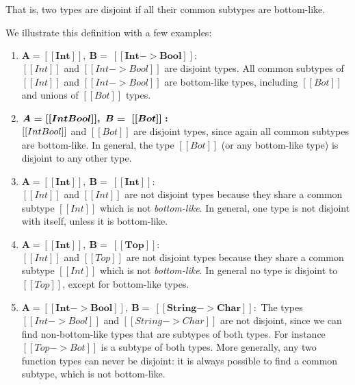 \noindent That is, two types are disjoint if all their common subtypes are bottom-like.
\begin{comment}
With this definition we have that different primitive types are disjoint. For example
$[[Int]] * [[Bool]]$ since the only common subtypes of $[[Int]]$ and $[[Bool]]$
are bottom-like. A more interesting case is the disjointness of two function types.
It turns out that function types are never disjoint, since we can always find
a common subtype for any two function types. For example, if we have $[[Int -> Bool]]$
and $[[String -> Char]]$ then a common subtype that is not bottom-like is
$[[Top -> Bot]]$. Therefore, $[[Int -> Bool]]$ and $[[String -> Char]]$ are not
disjoint.

\noindent Reader may think at this point that $[[Bot]]$ type can simply be used in \Cref{def:union:disj}
instead of $[[botlike C]]$ in the conclusion. Answer to this question is
union type with $[[Bot]]$ as all primitive types is also a least subtype in \cal.
$[[botlike C]]$ also handles this case.
\end{comment}
We illustrate this definition with a few examples:

\begin{enumerate}
  \item $\boldsymbol{A = [[Int]], \ B = \ [[Int -> Bool]]:}$ \\
        $[[Int]]$ and $[[Int -> Bool]]$ are disjoint types. All common subtypes
        of $[[Int]]$ and $[[Int -> Bool]]$ are bottom-like types,
        including $[[Bot]]$ and unions of $[[Bot]]$ types.
  \item $\boldsymbol{A = [[Int \/ Bool]], \ B = \ [[Bot]]:}$ \\
    $[[Int \/ Bool]]$ and $[[Bot]]$ are disjoint types, since again all common subtypes are bottom-like.
    In general, the type $[[Bot]]$ (or any bottom-like type)
    is disjoint to any other type.
  \item $\boldsymbol{A = [[Int]], \ B = \ [[Int]]:}$ \\
        $[[Int]]$ and $[[Int]]$ are not disjoint types because they share a common subtype $[[Int]]$ which
        is not \emph{bottom-like}. In general, one type is not disjoint with
        itself, unless it is bottom-like.
  \item $\boldsymbol{A = [[Int]], \ B = \ [[Top]]:}$ \\
        $[[Int]]$ and $[[Top]]$ are not disjoint types because they share a common
    subtype $[[Int]]$ which is not \emph{bottom-like}. In general no type
    is disjoint to $[[Top]]$, except for bottom-like types.
  \item $\boldsymbol{A = [[Int -> Bool]], \ B = \ [[String -> Char]]:}$
    The types $[[Int -> Bool]]$ and $[[String -> Char]]$ are not disjoint,
    since we can find non-bottom-like types that are subtypes
    of both types. For instance $[[Top -> Bot]]$ is a subtype of both types.
    More generally, any two function types can never be disjoint: it is always
    possible to find a common subtype, which is not bottom-like.
\end{enumerate}

